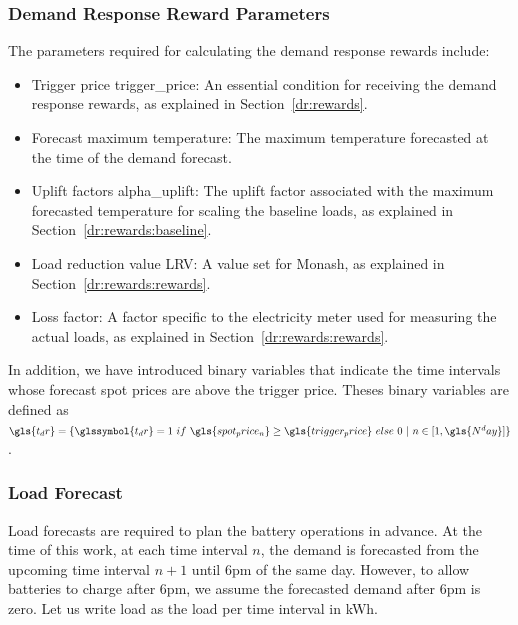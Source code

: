 \subsubsection{Demand Response Reward Parameters}

The parameters required for calculating the demand response rewards include:

\begin{itemize}
	\item Trigger price \gls{trigger_price}: An essential condition for receiving the demand response rewards, as explained in Section~\ref{dr:rewards}.
	
	\item Forecast maximum temperature: The maximum temperature forecasted at the time of the demand forecast. 
	
	\item Uplift factors \gls{alpha_uplift}: The uplift factor associated with the maximum forecasted temperature for scaling the baseline loads, as explained in Section~\ref{dr:rewards:baseline}.
	
	\item Load reduction value \gls{LRV}: A value set for Monash, as explained in Section~\ref{dr:rewards:rewards}.
	
	\item Loss factor: A factor specific to the electricity meter used for measuring the actual loads, as explained in Section~\ref{dr:rewards:rewards}. 
\end{itemize}

In addition, we have introduced binary variables that indicate the time intervals whose forecast spot prices are above the trigger price. Theses binary variables are defined as $\gls{t_dr} = \{ \glssymbol{t_dr} = 1~ if ~ \gls{spot_price_n} \geq \gls{trigger_price} ~ else~ 0~ \vert ~ n \in [1,\gls{N^day}] \}$.

 
\subsubsection{Load Forecast}

Load forecasts are required to plan the battery operations in advance. 
At the time of this work, at each time interval $n$, the demand is forecasted from the upcoming time interval $n+1$ until 6pm of the same day. However, to allow batteries to charge after 6pm, we assume the forecasted demand after 6pm is zero. Let us write \gls{load} as the load per time interval in kWh. 


